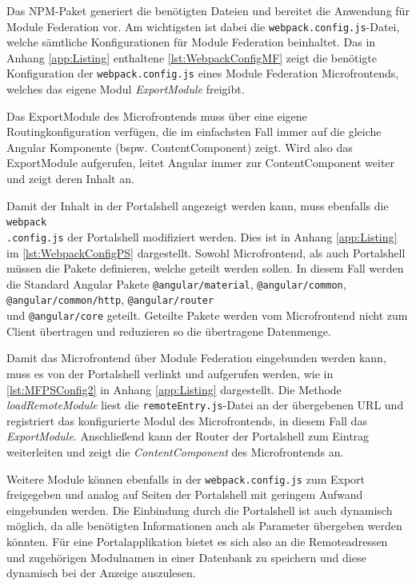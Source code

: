 Das \gls{NPM}-Paket generiert die benötigten Dateien und bereitet die Anwendung für Module Federation vor. Am wichtigsten ist dabei die \texttt{webpack.config.js}-Datei, welche sämtliche Konfigurationen für Module Federation beinhaltet. Das in Anhang \ref{app:Listing} enthaltene \cref{lst:WebpackConfigMF} zeigt die benötigte Konfiguration der \texttt{webpack.config.js} eines Module Federation Microfrontends, welches das eigene Modul \textit{ExportModule} freigibt.

Das ExportModule des Microfrontends muss über eine eigene Routingkonfiguration verfügen, die im einfachsten Fall immer auf die gleiche Angular Komponente (bspw. ContentComponent) zeigt. Wird also das ExportModule aufgerufen, leitet Angular immer zur ContentComponent weiter und zeigt deren Inhalt an.

Damit der Inhalt in der Portalshell angezeigt werden kann, muss ebenfalls die \texttt{webpack\\.config.js} der Portalshell modifiziert werden. Dies ist in Anhang \ref{app:Listing} im \cref{lst:WebpackConfigPS} dargestellt. Sowohl Microfrontend, als auch Portalshell müssen die Pakete definieren, welche geteilt werden sollen. In diesem Fall werden die Standard Angular Pakete \texttt{@angular/material}, \texttt{@angular/common}, \texttt{@angular/common/http}, \texttt{@angular/router} \\und \texttt{@angular/core} geteilt. Geteilte Pakete werden vom Microfrontend nicht zum Client übertragen und reduzieren so die übertragene Datenmenge.

Damit das Microfrontend über Module Federation eingebunden werden kann, muss es von der Portalshell verlinkt und aufgerufen werden, wie in \cref{lst:MFPSConfig2} in Anhang \ref{app:Listing} dargestellt. Die Methode \textit{loadRemoteModule} liest die \texttt{remoteEntry.js}-Datei an der übergebenen URL und registriert das konfigurierte Modul des Microfrontends, in diesem Fall das \textit{ExportModule}. Anschließend kann der Router der Portalshell zum Eintrag weiterleiten und zeigt die \textit{ContentComponent} des Microfrontends an.

Weitere Module können ebenfalls in der \texttt{webpack.config.js} zum Export freigegeben und analog auf Seiten der Portalshell mit geringem Aufwand eingebunden werden. Die Einbindung durch die Portalshell ist auch dynamisch möglich, da alle benötigten Informationen auch als Parameter übergeben werden könnten. Für eine Portalapplikation bietet es sich also an die Remoteadressen und zugehörigen Modulnamen in einer Datenbank zu speichern und diese dynamisch bei der Anzeige auszulesen.

